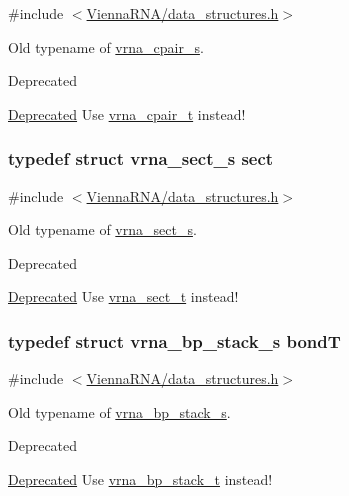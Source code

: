 {\ttfamily \#include $<$\hyperlink{data__structures_8h}{Vienna\-R\-N\-A/data\-\_\-structures.\-h}$>$}



Old typename of \hyperlink{group__data__structures_structvrna__cpair__s}{vrna\-\_\-cpair\-\_\-s}. 

\begin{DoxyRefDesc}{Deprecated}
\item[\hyperlink{deprecated__deprecated000044}{Deprecated}]Use \hyperlink{group__data__structures_gae4fc91141cc69c6d8eaf1332cb991ecc}{vrna\-\_\-cpair\-\_\-t} instead! \end{DoxyRefDesc}
\hypertarget{group__data__structures_gaaacedee1f05d3d45aa6764eca51a8876}{
\subsubsection[{sect}]{\setlength{\rightskip}{0pt plus 5cm}typedef struct {\bf vrna\-\_\-sect\-\_\-s} {\bf sect}}}\label{group__data__structures_gaaacedee1f05d3d45aa6764eca51a8876}


{\ttfamily \#include $<$\hyperlink{data__structures_8h}{Vienna\-R\-N\-A/data\-\_\-structures.\-h}$>$}



Old typename of \hyperlink{group__data__structures_structvrna__sect__s}{vrna\-\_\-sect\-\_\-s}. 

\begin{DoxyRefDesc}{Deprecated}
\item[\hyperlink{deprecated__deprecated000045}{Deprecated}]Use \hyperlink{group__data__structures_gacc9cdae790dac75a7024e7069c0d4400}{vrna\-\_\-sect\-\_\-t} instead! \end{DoxyRefDesc}
\hypertarget{group__data__structures_gaaeed53a7508c6ce549a98223e94b25df}{
\subsubsection[{bond\-T}]{\setlength{\rightskip}{0pt plus 5cm}typedef struct {\bf vrna\-\_\-bp\-\_\-stack\-\_\-s} {\bf bond\-T}}}\label{group__data__structures_gaaeed53a7508c6ce549a98223e94b25df}


{\ttfamily \#include $<$\hyperlink{data__structures_8h}{Vienna\-R\-N\-A/data\-\_\-structures.\-h}$>$}



Old typename of \hyperlink{group__data__structures_structvrna__bp__stack__s}{vrna\-\_\-bp\-\_\-stack\-\_\-s}. 

\begin{DoxyRefDesc}{Deprecated}
\item[\hyperlink{deprecated__deprecated000046}{Deprecated}]Use \hyperlink{group__data__structures_gaa651bda42e7692f08cb603cd6834b0ee}{vrna\-\_\-bp\-\_\-stack\-\_\-t} instead! \end{DoxyRefDesc}
